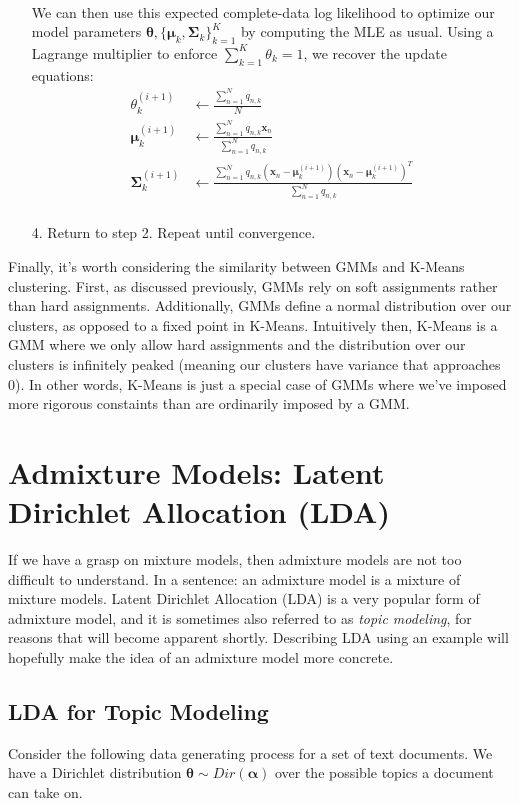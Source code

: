 \begin{itemize}
\begin{align*}
        \end{align*}
        We can then use this expected complete-data log likelihood to optimize our model parameters $\boldsymbol{\theta}, \{ \boldsymbol{\mu}_k, \boldsymbol{\Sigma}_k \}_{k=1}^{K}$ by computing the MLE as usual. Using a Lagrange multiplier to enforce $\sum_{k=1}^{K} \theta_k = 1$, we recover the update equations:
        \begin{align*}
            \theta_k^{(i + 1)} &\leftarrow \frac{\sum_{n=1}^{N} q_{n, k}}{N} \\
            \boldsymbol{\mu}_k^{(i + 1)} &\leftarrow \frac{\sum_{n=1}^{N} q_{n, k} \textbf{x}_n}{\sum_{n=1}^{N} q_{n, k}} \\
            \boldsymbol{\Sigma}_k^{(i + 1)} &\leftarrow \frac{\sum_{n=1}^{N} q_{n, k} (\textbf{x}_n - \boldsymbol{\mu}_k^{(i + 1)})(\textbf{x}_n - \boldsymbol{\mu}_k^{(i + 1)})^{T}}{\sum_{n=1}^{N} q_{n, k}} \\
        \end{align*}
    \item[4.] Return to step 2. Repeat until convergence.
\end{itemize}

Finally, it's worth considering the similarity between GMMs and K-Means clustering. First, as discussed previously, GMMs rely on soft assignments rather than hard assignments. Additionally, GMMs define a normal distribution over our clusters, as opposed to a fixed point in K-Means. Intuitively then, K-Means is a GMM where we only allow hard assignments and the distribution over our clusters is infinitely peaked (meaning our clusters have variance that approaches 0). In other words, K-Means is just a special case of GMMs where we've imposed more rigorous constaints than are ordinarily imposed by a GMM.

\section{Admixture Models: Latent Dirichlet Allocation (LDA)}
If we have a grasp on mixture models, then admixture models are not too difficult to understand. In a sentence: an admixture model is a mixture of mixture models. Latent Dirichlet Allocation (LDA) is a very popular form of admixture model, and it is sometimes also referred to as \textit{topic modeling}, for reasons that will become apparent shortly. Describing LDA using an example will hopefully make the idea of an admixture model more concrete.

\subsection{LDA for Topic Modeling}
Consider the following data generating process for a set of text documents. We have a Dirichlet distribution $\boldsymbol{\theta} \sim Dir(\boldsymbol{\alpha})$ over the possible topics a document can take on.

